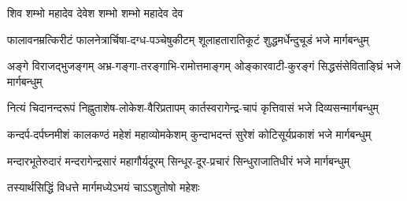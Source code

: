 

{शिव शम्भो महादेव देवेश शम्भो}
{शम्भो महादेव देव}

\twolineshloka
{फालावनम्रत्किरीटं फालनेत्रार्चिषा-दग्ध-पञ्चेषुकीटम्}
{शूलाहतारातिकूटं शुद्धमर्धेन्दुचूडं भजे मार्गबन्धुम्}

\twolineshloka
{अङ्गे विराजद्भुजङ्गम् अभ्र-गङ्गा-तरङ्गाभि-रामोत्तमाङ्गम्}
{ओङ्कारवाटी-कुरङ्गं सिद्धसंसेविताङ्घ्रिं भजे मार्गबन्धुम्}

\twolineshloka
{नित्यं चिदानन्दरूपं निह्नुताशेष-लोकेश-वैरिप्रतापम्}
{कार्तस्वरागेन्द्र-चापं कृत्तिवासं भजे दिव्यसन्मार्गबन्धुम्}

\twolineshloka
{कन्दर्प-दर्पघ्नमीशं कालकण्ठं महेशं महाव्योमकेशम्}
{कुन्दाभदन्तं सुरेशं कोटिसूर्यप्रकाशं भजे मार्गबन्धुम्}

\twolineshloka
{मन्दारभूतेरुदारं मन्दरागेन्द्रसारं महागौर्यदूरम्}
{सिन्धूर-दूर-प्रचारं सिन्धुराजातिधीरं भजे मार्गबन्धुम्}

{तस्यार्थसिद्धिं विधत्ते मार्गमध्येऽभयं चाऽऽशुतोषो महेशः}